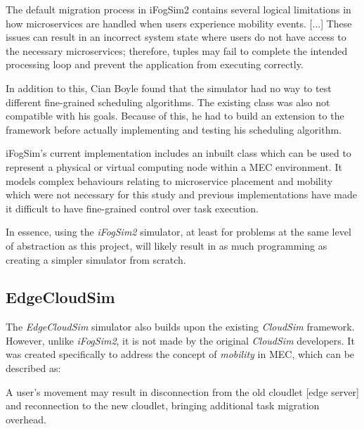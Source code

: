 \documentclass[]{UCD_CS_FYP_Report}
\renewenvironment{leftbar}{%
    \def\FrameCommand{%
        {\color{gray}\vrule width 1pt}%
        \hspace{12pt}%
    }%
    \MakeFramed{%
        \advance\hsize-\width
        \FrameRestore
        \setlength{\parskip}{0pt}%
    }%
    \itshape
    \vspace{8pt}%
}{%
    \par\vspace{8pt}%
    \endMakeFramed
    \vspace{-\parskip}%
}
\begin{document}
\begin{leftbar}
    The default migration process in iFogSim2 contains several logical limitations in how microservices are handled when users experience mobility events. [...] These issues can result in an incorrect system state where users do not have access to the necessary microservices; therefore, tuples may fail to complete the intended processing loop and prevent the application from executing correctly. \cite{finn2026hepa}
\end{leftbar}

In addition to this, Cian Boyle found that the simulator had no way to test different fine-grained scheduling algorithms. The existing  class was also not compatible with his goals. Because of this, he had to build an extension to the framework before actually implementing and testing his scheduling algorithm.

\begin{leftbar}
    iFogSim’s current implementation includes an inbuilt \textnormal{} class which can be used to represent a physical or virtual computing node within a MEC environment. It models complex behaviours relating to microservice placement and mobility which were not necessary for this  study and previous implementations have made it difficult to have fine-grained control over task execution. \cite{boyle2026pats}
\end{leftbar}

In essence, using the \textit{iFogSim2} simulator, at least for problems at the same level of abstraction as this project, will likely result in as much programming as creating a simpler simulator from scratch.

\subsection{EdgeCloudSim}
The \textit{EdgeCloudSim} \cite{edgecloudsim2018} simulator also builds upon the existing \textit{CloudSim} framework. However, unlike \textit{iFogSim2}, it is not made by the original \textit{CloudSim} developers. It was created specifically to address the concept of \textit{mobility} in MEC, which can be described as:

\begin{leftbar}
    A user's movement may result in disconnection from the old cloudlet [edge server] and reconnection to the new cloudlet, bringing additional task migration overhead. \cite{zheng2024mobility}
\end{leftbar}
\end{document}
